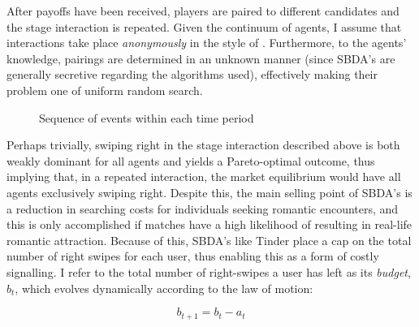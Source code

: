 After payoffs have been received, players are paired to different candidates and the stage interaction is repeated. Given the continuum of agents, I assume that interactions take place \textit{anonymously} in the style of \cite{jovanovic1988anonymous}. Furthermore, to the agents' knowledge, pairings are determined in an unknown manner (since SBDA's are generally secretive regarding the algorithms used), effectively making their problem one of uniform random search.

\begin{figure}[ht]
    \centering 
    \caption{Sequence of events within each time period}
    \vspace{20pt} 
    \label{fig:timeline}
\end{figure}

Perhaps trivially, swiping right in the stage interaction described above is both weakly dominant for all agents and yields a Pareto-optimal outcome, thus implying that, in a repeated interaction, the market equilibrium would have all agents exclusively swiping right. Despite this, the main selling point of SBDA's is a reduction in searching costs for individuals seeking romantic encounters, and this is only accomplished if matches have a high likelihood of resulting in real-life romantic attraction. Because of this, SBDA's like Tinder place a cap on the total number of right swipes for each user, thus enabling this as a form of costly signalling. I refer to the total number of right-swipes a user has left as its \textit{budget}, $b_t$, which evolves dynamically according to the law of motion:

\begin{equation*} 
  b_{t+1}= b_{t}- a_{t} 
\end{equation*}

